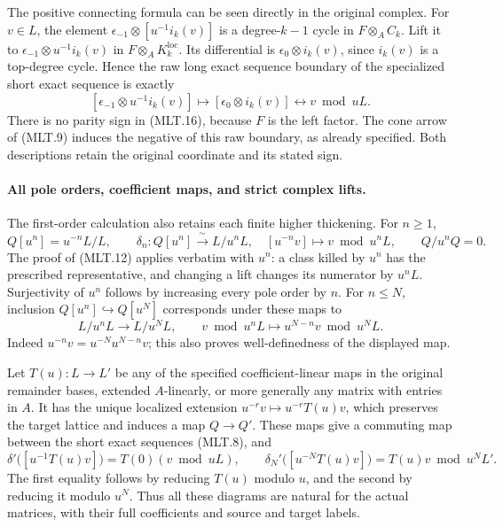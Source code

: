 The positive connecting formula can be seen
directly in the original complex. For \(v\in L\),
the element
\(\epsilon_{-1}\otimes[u^{-1}i_k(v)]\)
is a degree-\(k-1\) cycle in \(F\otimes_A C_k\).
Lift it to
\(\epsilon_{-1}\otimes u^{-1}i_k(v)\)
in \(F\otimes_A K_k^{\mathrm{loc}}\).
Its differential is
\(\epsilon_0\otimes i_k(v)\), since \(i_k(v)\)
is a top-degree cycle. Hence the raw long exact
sequence boundary of the specialized short exact
sequence is exactly
\[
 [\epsilon_{-1}\otimes u^{-1}i_k(v)]
       \longmapsto[\epsilon_0\otimes i_k(v)]
       \longleftrightarrow v\bmod uL.                   \tag{MLT.16}
\]
There is no parity sign in (MLT.16), because \(F\)
is the left factor. The cone arrow of (MLT.9)
induces the negative of this raw boundary, as
already specified. Both descriptions retain
the original coordinate and its stated sign.

\paragraph{All pole orders, coefficient maps, and strict complex lifts.}
The first-order calculation also retains each
finite higher thickening. For \(n\ge1\),
\[
 Q[u^n]=u^{-n}L/L,\qquad
 \delta_n:Q[u^n]\xrightarrow{\ \sim\ }L/u^nL,\quad
       [u^{-n}v]\mapsto v\bmod u^nL,\qquad Q/u^nQ=0.
                                                               \tag{MLT.17}
\]
The proof of (MLT.12) applies verbatim with \(u^n\):
a class killed by \(u^n\) has the prescribed
representative, and changing a lift changes its
numerator by \(u^nL\). Surjectivity of \(u^n\)
follows by increasing every pole order by \(n\).
For \(n\le N\), inclusion \(Q[u^n]\hookrightarrow Q[u^N]\)
corresponds under these maps to
\[
 L/u^nL\longrightarrow L/u^NL,\qquad
       v\bmod u^nL\longmapsto u^{N-n}v\bmod u^NL.
                                                               \tag{MLT.18}
\]
Indeed \(u^{-n}v=u^{-N}u^{N-n}v\); this also
proves well-definedness of the displayed map.

Let \(T(u):L\to L'\) be any of the specified
coefficient-linear maps in the original remainder
bases, extended \(A\)-linearly, or more generally
any matrix with entries in \(A\). It has the
unique localized extension
\(u^{-r}v\mapsto u^{-r}T(u)v\), which preserves
the target lattice and induces a map \(Q\to Q'\).
These maps give a commuting map between the
short exact sequences (MLT.8), and
\[
 \delta' \bigl([u^{-1}T(u)v]\bigr)
       =T(0)(v\bmod uL),\qquad
 \delta_N'\bigl([u^{-N}T(u)v]\bigr)
       =T(u)v\bmod u^NL'.                               \tag{MLT.19}
\]
The first equality follows by reducing \(T(u)\)
modulo \(u\), and the second by reducing it
modulo \(u^N\). Thus all these diagrams are
natural for the actual matrices, with their full
coefficients and source and target labels.

